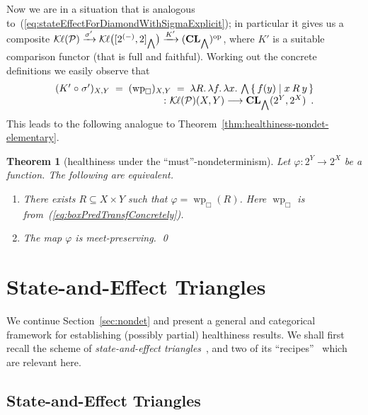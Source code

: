 \documentclass[9pt, preprint]{sigplanconf}
\theoremstyle{theorem}
\newtheorem{theorem}{Theorem}[section]
\theoremstyle{definition}
\newcommand{\pow}{\mathcal{P}}
\newcommand{\set}[2]{\left\{\, #1 \mathrel{}\middle|\mathrel{} #2 \,\right\}}
\newcommand{\place}{{-}}
\newcommand{\op}{\mathrm{op}}
\newcommand{\CL}{\mathbf{CL}}
\newcommand{\Kl}{\mathcal{K}{\kern-.2ex}\ell}
\newcommand{\bigland}{\bigwedge}
\newcommand{\co}{\mathrel{\circ}}
\newcommand{\wpre}{\mathop{\mathrm{wp}}\nolimits}
\begin{document}
Now we are in a situation that is analogous
to~(\ref{eq:stateEffectForDiamondWithSigmaExplicit}); in particular it
gives us a composite $\Kl(\pow)\xrightarrow{\sigma'}
\Kl\bigl([2^{(\place)}, 2]_{\bigwedge}\bigr)
\xrightarrow{K'}
(\CL_{\bigland})^{\op}$,
where $K'$ is a suitable comparison functor (that is full and
faithful). Working out the concrete definitions we easily observe that
\begin{align*}
\begin{array}{r}
   (K'\co \sigma')_{X,Y}\;=\;(\wpre_{\Box})_{X,Y}
  \;=\; \lambda R.\,\lambda f.\,\lambda x.\, \bigland \set{f(y)}{x \mathbin{R}
 y}
 \\
  \colon \Kl(\pow)(X,Y)\longrightarrow \CL_{\bigland}(2^{Y},2^{X})
  \enspace.
\end{array}
\end{align*}
This leads to the following analogue to
Theorem~\ref{thm:healthiness-nondet-elementary}.
\begin{theorem}[healthiness under the ``must''-nondeterminism]
 \label{thm:healthiness-nondet-elementary-box}
 Let $\varphi\colon 2^{Y}\to 2^{X}$ be a function. The following
	are equivalent.
	\begin{enumerate}
	 \item  There exists
	       $R\subseteq X\times Y$ such that
	       $\varphi=\wpre_{\Box}(R)$. Here $\wpre_{\Box}$ is
		from~(\ref{eq:boxPredTransfConcretely}).
	 \item The map $\varphi$ is meet-preserving. \qed
	\end{enumerate}
\end{theorem}


\section{State-and-Effect Triangles}
\label{sec:general-healthiness}
We continue Section~\ref{sec:nondet} and present a general and
categorical framework for establishing (possibly partial) healthiness
results.  We shall first recall the scheme of \emph{state-and-effect
  triangles}~\cite{Jacobs14CMCS,Jacobs15LMCS,Jacobs15CALCO}, and two
of its ``recipes''~\cite{Jacobs15CALCO,Hasuo15TCS} which are relevant
here.




\subsection{State-and-Effect Triangles}
\label{sub:stateAndEffectTriangles}
\end{document}
